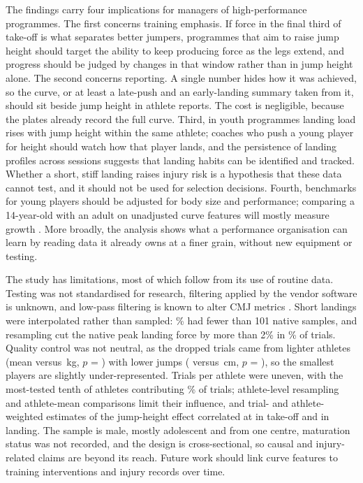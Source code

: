 The findings carry four implications for managers of high-performance programmes. The first concerns training emphasis. If force in the final third of take-off is what separates better jumpers, programmes that aim to raise jump height should target the ability to keep producing force as the legs extend, and progress should be judged by changes in that window rather than in jump height alone. The second concerns reporting. A single number hides how it was achieved, so the curve, or at least a late-push and an early-landing summary taken from it, should sit beside jump height in athlete reports. The cost is negligible, because the plates already record the full curve. Third, in youth programmes landing load rises with jump height within the same athlete; coaches who push a young player for height should watch how that player lands, and the persistence of landing profiles across sessions suggests that landing habits can be identified and tracked. Whether a short, stiff landing raises injury risk is a hypothesis that these data cannot test, and it should not be used for selection decisions. Fourth, benchmarks for young players should be adjusted for body size and performance; comparing a 14-year-old with an adult on unadjusted curve features will mostly measure growth \parencite{lloyd2012,malina2015}. More broadly, the analysis shows what a performance organisation can learn by reading data it already owns at a finer grain, without new equipment or testing.

The study has limitations, most of which follow from its use of routine data. Testing was not standardised for research, filtering applied by the vendor software is unknown, and low-pass filtering is known to alter CMJ metrics \parencite{harry2022}. Short landings were interpolated rather than sampled: \pctLdUnder\% had fewer than 101 native samples, and resampling cut the native peak landing force by more than 2\% in \retLdPctTwo\% of trials. Quality control was not neutral, as the dropped trials came from lighter athletes (mean \bmDropped{} versus \bmKept\,kg, $p$ = \pBmDropped) with lower jumps (\jhDropped{} versus \jhKept\,cm, $p$ = \pJhDropped), so the smallest players are slightly under-represented. Trials per athlete were uneven, with the most-tested tenth of athletes contributing \pctTopTen\% of trials; athlete-level resampling and athlete-mean comparisons limit their influence, and trial- and athlete-weighted estimates of the jump-height effect correlated at \wcorJHto{} in take-off and \wcorJHld{} in landing. The sample is male, mostly adolescent and from one centre, maturation status was not recorded, and the design is cross-sectional, so causal and injury-related claims are beyond its reach. Future work should link curve features to training interventions and injury records over time.
